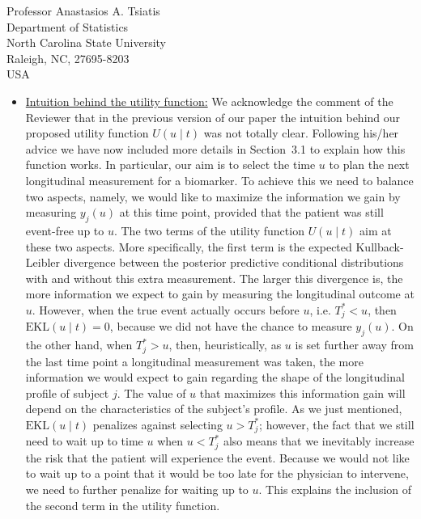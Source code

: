 \documentclass[a4paper, 11pt]{letter}
\begin{document}
\begin{letter}{Professor Anastasios A. Tsiatis\\
Department of Statistics\\
North Carolina State University\\
Raleigh, NC, 27695-8203\\
USA}
\begin{itemize}
\item \underline{Intuition behind the utility function:} We acknowledge the comment of the Reviewer that in the previous version of our paper the intuition behind our proposed utility function $U(u \mid t)$ was not totally clear. Following his/her advice we have now included more details in Section~3.1 to explain how this function works. In particular, our aim is to select the time $u$ to plan the next longitudinal measurement for a biomarker. To achieve this we need to balance two aspects, namely, we would like to maximize the information we gain by measuring $y_j(u)$ at this time point, provided that the patient was still event-free up to $u$. The two terms of the utility function $U(u \mid t)$ aim at these two aspects. More specifically, the first term is the expected Kullback-Leibler divergence between the posterior predictive conditional distributions with and without this extra measurement. The larger this divergence is, the more information we expect to gain by measuring the longitudinal outcome at $u$. However, when the true event actually occurs before $u$, i.e. $T_j^* < u$, then $\mbox{EKL}(u \mid t) = 0$, because we did not have the chance to measure $y_j(u)$. On the other hand, when $T_j^* > u$, then, heuristically, as $u$ is set further away from the last time point a longitudinal measurement was taken, the more information we would expect to gain regarding the shape of the longitudinal profile of subject $j$. The value of $u$ that maximizes this information gain will depend on the characteristics of the subject's profile. As we just mentioned, $\mbox{EKL}(u \mid t)$ penalizes against selecting $u > T_j^*$; however, the fact that we still need to wait up to time $u$ when $u < T_j^*$ also means that we inevitably increase the risk that the patient will experience the event. Because we would not like to wait up to a point that it would be too late for the physician to intervene, we need to further penalize for waiting up to $u$. This explains the inclusion of the second term in the utility function.


\end{itemize}
\end{letter}
\end{document}
